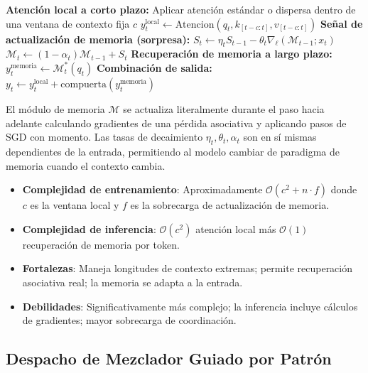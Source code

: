 \begin{algorithmic}[1]
\State \textbf{Atención local a corto plazo:} Aplicar atención estándar o dispersa dentro de una ventana de contexto fija $c$
\State $y_t^{\text{local}} \gets \text{Atencion}(q_t, k_{[t-c:t]}, v_{[t-c:t]})$
\State \textbf{Señal de actualización de memoria (sorpresa):}
\State $S_t \gets \eta_t S_{t-1} - \theta_t \nabla_\ell(\mathcal{M}_{t-1}; x_t)$ 
\State $\mathcal{M}_t \gets (1 - \alpha_t) \mathcal{M}_{t-1} + S_t$ 
\State \textbf{Recuperación de memoria a largo plazo:}
\State $y_t^{\text{memoria}} \gets \mathcal{M}_t^* (q_t)$ 
\State \textbf{Combinación de salida:}
\State $y_t \gets y_t^{\text{local}} + \text{compuerta}(y_t^{\text{memoria}})$ 
\end{algorithmic}

El módulo de memoria $\mathcal{M}$ se actualiza literalmente durante el paso hacia adelante calculando gradientes de una pérdida asociativa y aplicando pasos de SGD con momento. Las tasas de decaimiento $\eta_t, \theta_t, \alpha_t$ son en sí mismas dependientes de la entrada, permitiendo al modelo cambiar de paradigma de memoria cuando el contexto cambia.

\begin{itemize}[leftmargin=*]
    \item \textbf{Complejidad de entrenamiento}: Aproximadamente $\mathcal{O}(c^2 + n \cdot f)$ donde $c$ es la ventana local y $f$ es la sobrecarga de actualización de memoria.
    \item \textbf{Complejidad de inferencia}: $\mathcal{O}(c^2)$ atención local más $\mathcal{O}(1)$ recuperación de memoria por token.
    \item \textbf{Fortalezas}: Maneja longitudes de contexto extremas; permite recuperación asociativa real; la memoria se adapta a la entrada.
    \item \textbf{Debilidades}: Significativamente más complejo; la inferencia incluye cálculos de gradientes; mayor sobrecarga de coordinación.
\end{itemize}

\subsection{Despacho de Mezclador Guiado por Patrón}

